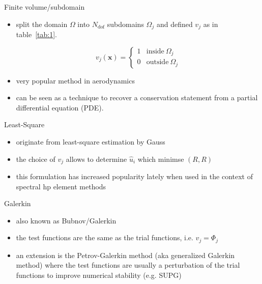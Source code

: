 \begin{frame}{Finite volume/subdomain}
  \begin{itemize}
  \item split the domain $\Omega$ into $N_{\text{dof}}$ subdomains
    $\Omega_j$ and defined $v_j$ as in table~\ref{tab:1}.

    \begin{equation}
      \label{eq:7}
      v_j(\mathbf{x})=
      \begin{cases}
        1 & \text{inside} \ \Omega_j\\
        0 & \text{outside} \ \Omega_j
      \end{cases}
    \end{equation}
  \item very popular method in aerodynamics
  \item can be seen as a technique to recover a conservation statement from a partial differential equation (PDE).
  \end{itemize}
\end{frame}

\begin{frame}{Least-Square}
  \begin{itemize}
  \item originate from least-square estimation by Gauss
  \item the choice of $v_j$ allows to determine $\hat{u}_i$ which minimse $(R,R)$
  \item this formulation has increased popularity lately when used in the context of spectral hp element methods
  \end{itemize}
\end{frame}

\begin{frame}{Galerkin}
  \begin{itemize}
  \item also known as Bubnov/Galerkin
  \item the test functions are the same as the trial functions, i.e. $v_j = \Phi_j$
  \item an extension is the Petrov-Galerkin method (aka generalized Galerkin method)
    where the test functions are usually a perturbation of the trial
    functions to improve numerical stability (e.g. SUPG)
  \end{itemize}

\end{frame}


